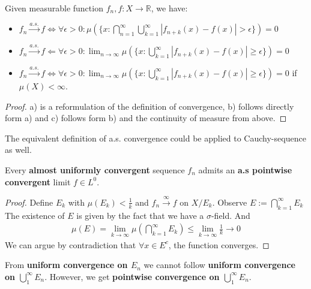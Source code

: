 \begin{lemma}
	Given measurable function $f_n, f : X \rightarrow \mathbb{R}$, we have:
	\begin{itemize}
		\item $f_n \overset{a.s.}{\rightarrow} f \Leftrightarrow \forall \epsilon > 0:
		  \mu( \{x:   \bigcap_{n = 1}^\infty  \bigcup_{k = 1}^\infty |f_{n + k}(x) - f(x)| > \epsilon \}) = 0 $
		  \item $f_n \overset{a.s.}{\rightarrow} f \Leftarrow \forall \epsilon > 0 : \lim_{n \rightarrow \infty} \mu(\{x: \bigcup_{k = 1}^\infty | f_{n+k}(x) - f(x)| \geq \epsilon \}) = 0 $
		  \item $f_n \overset{a.s.}{\rightarrow} f \Leftrightarrow \forall \epsilon > 0  : \lim_{n \rightarrow \infty} \mu(\{x: \bigcup_{k = 1}^\infty | f_{n+k}(x) - f(x)| \geq \epsilon \}) = 0 $ if $\mu(X) < \infty$.		  
	\end{itemize}
\end{lemma}
\begin{proof}
	a) is a reformulation of the definition of convergence, b) follows directly form a) and c) follows form b) and the continuity of measure from above. 
\end{proof}
\begin{remark}
The equivalent definition of a.s. convergence could be applied to Cauchy-sequence as well.	
\end{remark}

\begin{lemma}
	Every \textbf{almost uniformly convergent} sequence $f_n$ admits an \textbf{a.s pointwise convergent} limit $f \in L^0$.
\end{lemma}
\begin{proof}
	Define $E_k$ with $\mu(E_k) < \frac{1}{k}$ and $f_n \overset{\infty}{\rightarrow} f$ on $X \slash E_k$. Observe $E:= \bigcap_{k = 1}^\infty E_k$\\ 
	The existence of $E$ is given by the fact that we have a $\sigma$-field. And 
	\begin{align*}
		\mu(E) = \lim_{k \rightarrow \infty} \mu (\bigcap_{k = 1}^{\infty} E_k) \leq \lim_{k \rightarrow \infty} \frac{1}{k} \rightarrow 0
	\end{align*}
	We can argue by contradiction that $\forall x \in E^c$, the function converges.
\end{proof}
\begin{remark}
From \textbf{uniform convergence on $E_n$} we cannot follow \textbf{uniform convergence on $\bigcup^\infty_1 E_n$}. However, we get \textbf{pointwise convergence on $\bigcup_1^\infty E_n$}.	
\end{remark}

